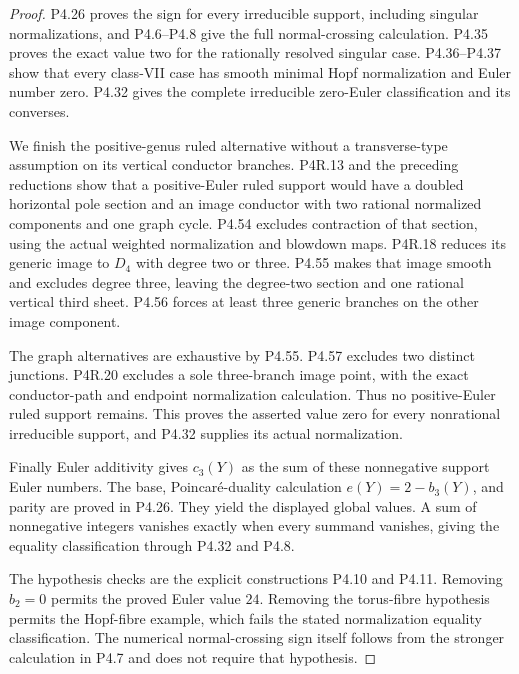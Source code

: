 \begin{proof}
P4.26 proves the sign for every irreducible support,
including singular normalizations, and P4.6--P4.8 give
the full normal-crossing calculation. P4.35 proves the
exact value two for the rationally resolved singular
case. P4.36--P4.37 show that every class-VII case has
smooth minimal Hopf normalization and Euler number
zero. P4.32 gives the complete irreducible zero-Euler
classification and its converses.

We finish the positive-genus ruled alternative without
a transverse-type assumption on its vertical conductor
branches. P4R.13 and the preceding reductions show that
a positive-Euler ruled support would have a doubled
horizontal pole section and an image conductor with two
rational normalized components and one graph cycle.
P4.54 excludes contraction of that section, using the
actual weighted normalization and blowdown maps.
P4R.18 reduces its generic image to $D_4$ with degree
two or three. P4.55 makes that image smooth and excludes
degree three, leaving the degree-two section and one
rational vertical third sheet. P4.56 forces at least
three generic branches on the other image component.

The graph alternatives are exhaustive by P4.55. P4.57
excludes two distinct junctions. P4R.20 excludes a sole
three-branch image point, with the exact conductor-path
and endpoint normalization calculation. Thus no
positive-Euler ruled support remains. This proves the
asserted value zero for every nonrational irreducible
support, and P4.32 supplies its actual normalization.

Finally Euler additivity gives $c_3(Y)$ as the sum of
these nonnegative support Euler numbers. The base,
Poincar\'e-duality calculation $e(Y)=2-b_3(Y)$, and
parity are proved in P4.26. They yield the displayed
global values. A sum of nonnegative integers vanishes
exactly when every summand vanishes, giving the equality
classification through P4.32 and P4.8.

The hypothesis checks are the explicit constructions
P4.10 and P4.11. Removing $b_2=0$ permits the proved
Euler value $24$. Removing the torus-fibre hypothesis
permits the Hopf-fibre example, which fails the stated
normalization equality classification. The numerical
normal-crossing sign itself follows from the stronger
calculation in P4.7 and does not require that hypothesis.
\end{proof}

